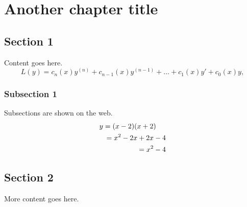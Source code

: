\documentclass[a4paper]{report}
\begin{document}
\setcounter{chapter}{1}
\chapter{Another chapter title}

\section{Section 1}
Content goes here.
\begin{equation}
\label{eqn:intro:linearo}
L(y)= c_n(x)y^{(n)} + c_{n-1}(x)y^{(n-1)}+\ldots + c_1(x)y' + c_0(x)y,
\end{equation}

\subsection{Subsection 1}
Subsections are shown on the web.
\begin{eqnarray*}
	\lefteqn{y = (x-2)(x+2)} \\
	&& = x^2-2x+2x-4 \\
	&& = x^2-4 
\end{eqnarray*}

\section{Section 2}
More content goes here.

\end{document}
